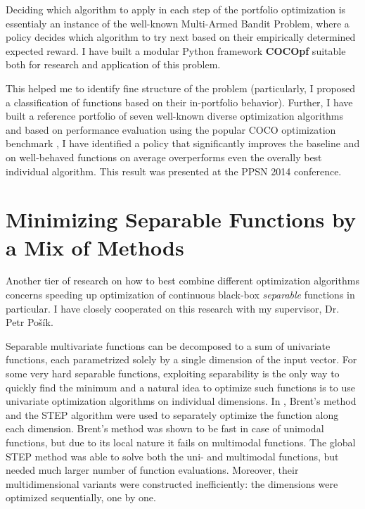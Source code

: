 Deciding which algorithm to apply in each step of the portfolio
optimization is essentialy an instance of the well-known Multi-Armed
Bandit Problem, where a policy decides which algorithm to try next
based on their empirically determined expected reward.
I have built a modular Python framework \textbf{COCOpf} \citep{cocopf}
suitable both for research and application of this problem.

This helped me to identify fine structure of the problem
(particularly, I proposed a classification of functions based on
their in-portfolio behavior).
Further, I have built a reference portfolio of seven well-known
diverse optimization algorithms and based on performance evaluation
using the popular COCO optimization benchmark \citep{COCO1}, I have
identified a policy that significantly improves the baseline and
on well-behaved functions on average overperforms even the overally
best individual algorithm. This result was presented at the
PPSN 2014 conference. \citep{Baudis2014PPSNOnlinePortfolios}

\section{Minimizing Separable Functions by a Mix of Methods}

Another tier of research on how to best combine different optimization
algorithms concerns speeding up optimization of continuous black-box
\textit{separable} functions in particular.  I have closely cooperated
on this research with my supervisor, Dr. Petr Pošík.

Separable multivariate functions can be decomposed to a sum of univariate
functions, each parametrized solely by a single dimension of the input
vector.
For some very hard separable functions, exploiting separability
is the only way to quickly find the minimum and a natural idea to optimize
such functions is to use univariate optimization algorithms on individual
dimensions.
In \citep{PosikGECCO2009LineSearch}, Brent's method \citep{Brent1973} and the STEP algorithm \citep{STEP} were used to separately optimize the function along each dimension.
Brent's method was shown to be fast in case of unimodal functions, but due to its local nature it fails on multimodal functions.
The global STEP method was able to solve both the uni- and multimodal functions, but needed much larger number of function evaluations.
Moreover, their multidimensional variants were constructed inefficiently: the dimensions were optimized sequentially, one by one.

